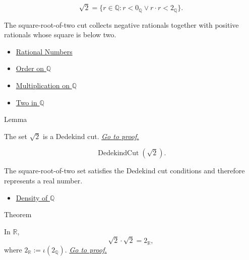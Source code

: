 \begin{remark*}
\[
\sqrt{2}=\{r\in\mathbb{Q}:r<0_{\mathbb{Q}}\lor r\cdot r<2_{\mathbb{Q}}\}.
\]
\end{remark*}

\begin{remark*}[Interpretation]
The square-root-of-two cut collects negative rationals together with positive rationals whose square is below two.
\end{remark*}

\begin{dependencies}
\begin{itemize}
  \item \hyperref[def:rationals]{Rational Numbers}
  \item \hyperref[def:order-on-q]{Order on $\mathbb{Q}$}
  \item \hyperref[def:multiplication-on-q-classes]{Multiplication on $\mathbb{Q}$}
  \item \hyperref[def:two-in-q]{Two in $\mathbb{Q}$}
\end{itemize}
\end{dependencies}

\begin{lemmabox}{Lemma}
\begin{lemma}
\label{lem:sqrt-two-is-a-cut}
The set $\sqrt{2}$ is a Dedekind cut.
\hyperref[prf:sqrt-two-is-a-cut]{\textit{Go to proof.}}
\end{lemma}
\end{lemmabox}

\begin{remark*}
\[
\operatorname{DedekindCut}(\sqrt{2}).
\]
\end{remark*}

\begin{remark*}[Interpretation]
The square-root-of-two set satisfies the Dedekind cut conditions and therefore represents a real number.
\end{remark*}

\begin{dependencies}
\begin{itemize}
  \item \hyperref[thm:density-of-q]{Density of $\mathbb{Q}$}
\end{itemize}
\end{dependencies}

\begin{theorembox}{Theorem}
\begin{theorem}
\label{thm:sqrt-two-squared-is-two}
In $\mathbb{R}$,
\[
\sqrt{2}\cdot\sqrt{2}=2_{\mathbb{R}},
\]
where $2_{\mathbb{R}}:=\iota(2_{\mathbb{Q}})$.
\hyperref[prf:sqrt-two-squared-is-two]{\textit{Go to proof.}}
\end{theorem}
\end{theorembox}

